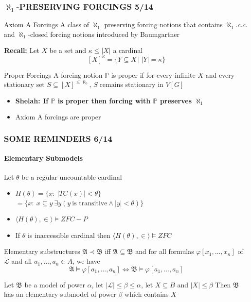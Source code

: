 \documentclass{beamer}
\begin{document}
\begin{frame}
\frametitle{$\aleph_1$-PRESERVING FORCINGS \hspace{43.5mm}5/14}
\begin{block}{Axiom A Forcings}
A class of $\aleph_1$ preserving forcing notions that contains $\aleph_1.c.c.$ and $\aleph_1$-closed forcing notions introduced by Baumgartner
\end{block}
\textbf{Recall: }Let $X$ be a set and $\kappa \leq |X|$ a cardinal
$$[X]^{\kappa}=\{Y \subseteq X \ | \ |Y|= \kappa\}$$
\begin{block}{Proper Forcings}
A forcing notion $\mathbb{P}$ is proper if for every infinite $X$ and every stationary set $S \subseteq [X]^{\leq \aleph_0}$, $S$ remains stationary in $V[G]$
\begin{itemize}
\item \textbf{Shelah: If $\mathbb{P}$ is proper then forcing with $\mathbb{P}$ preserves $\aleph_1$}
\item Axiom A forcings are proper
\end{itemize}
\end{block}
\end{frame}
\begin{frame}
\frametitle{SOME REMINDERS \hspace{64mm}6/14}
\framesubtitle{Elementary Submodels}
Let $\theta$ be a regular uncountable cardinal
\begin{itemize}
\item $H(\theta)=\{x: \ |TC(x)| < \theta \}$\\
\hspace{9mm}$=\{x: \ x \subseteq y \ \exists y(y \ \text{is transitive} \land |y| < \theta)\}$
\item $\langle H(\theta), \in \rangle \models ZFC-P$
\item If $\theta$ is inaccessible cardinal then $\langle H(\theta), \in \rangle \models ZFC$
\end{itemize}
\begin{block}{Elementary substructures}
$\mathfrak{A} \prec \mathfrak{B}$ iff $\mathfrak{A} \subseteq \mathfrak{B}$ and for all formulas $\varphi[x_1, \dots, x_n]$ of $\mathscr{L}$ and all $a_1, \dots, a_n \in A$, we have
$$\mathfrak{A}\models \varphi[a_1, \dots, a_n] \iff \mathfrak{B}\models \varphi[a_1, \dots, a_n]$$
\end{block}
Let $\mathfrak{B}$ be a model of power $\alpha$, let $|\mathscr{L}| \leq \beta \leq \alpha$, let $X \subseteq B$ and $|X| \leq \beta$ Then $\mathfrak{B}$ has an elementary submodel of power $\beta$ which contains $X$
\end{frame}
\end{document}
